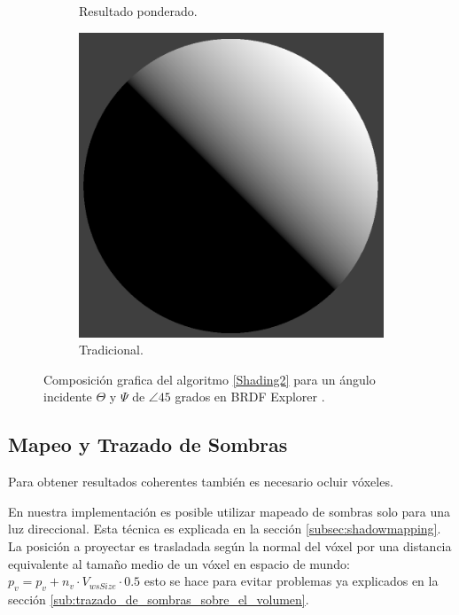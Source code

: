 \begin{figure}[H]
\begin{subfigure}[t]{0.2\textwidth}
		\caption*{Resultado ponderado.}
	\end{subfigure}%
	\begin{subfigure}[t]{0.2\textwidth}
		\centering
		\captionsetup{justification=centering}
		\includegraphics[width=\linewidth]{media/nDotLT.png}
		\caption*{Tradicional.}
	\end{subfigure}%
	\caption{Composición grafica del algoritmo \ref{Shading2} para un ángulo incidente $\Theta$ y $\Psi$ de $\angle 45$ grados en BRDF Explorer \cite{brdf_explorer}.}
	\label{fig:compositve_vshading}
\end{figure}

\subsection{Mapeo y Trazado de Sombras}

Para obtener resultados coherentes también es necesario ocluir vóxeles. 

En nuestra implementación es posible utilizar mapeado de sombras solo para una luz direccional. Esta técnica es explicada en la sección \ref{subsec:shadowmapping}. La posición a proyectar es trasladada según la normal del vóxel por una distancia equivalente al tamaño medio de un vóxel en espacio de mundo: $p_{v} = p_{v} + n_{v}\cdot V_{wsSize} \cdot 0.5$ esto se hace para evitar problemas ya explicados en la sección \ref{sub:trazado_de_sombras_sobre_el_volumen}.

